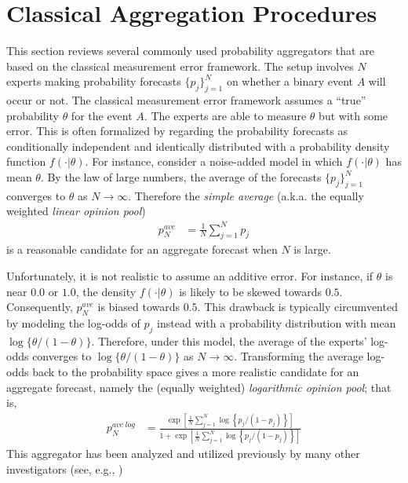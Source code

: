 \documentclass[11pt]{article}
\theoremstyle{definition}
\theoremstyle{definition}
\begin{document}
\section{Classical Aggregation Procedures}
\label{classics}
%
%
This section reviews several commonly used probability aggregators that are based on the classical measurement error framework. The setup involves $N$ experts making probability forecasts $\{p_j\}_{j=1}^N$ on whether a binary event $A$ will occur or not. The classical measurement error framework assumes a ``true'' probability $\theta$ for the event $A$. The experts are able to measure $\theta$ but with some error. This is often formalized by regarding the probability forecasts as conditionally independent and identically distributed  with a probability density function $f(\cdot | \theta)$. 
For instance, consider a noise-added model in which
 $f(\cdot | \theta)$ has mean $\theta$. By the law of large numbers, the average of the forecasts $\{ p_j \}_{j=1}^N$ converges to $\theta$ as $N \to \infty$. Therefore the \textit{simple average} (a.k.a. the equally weighted \textit{linear opinion pool})
\begin{align*}
p_N^{ave} &= \frac{1}{N} \sum_{j=1}^N p_j
\end{align*}
is a reasonable candidate for an aggregate forecast when $N$ is large.

Unfortunately, it is not realistic to assume an additive error. For instance, if $\theta$ is near $0.0$ or $1.0$,  the density $f(\cdot | \theta)$ is likely to be skewed towards $0.5$.  Consequently, $p_{N}^{ave}$ is biased towards $0.5$. This drawback is typically circumvented by modeling the log-odds of $p_j$ instead with a probability distribution with mean $\log\{\theta/(1-\theta)\}$. Therefore, under this model, the average of the experts' log-odds converges to $\log\{\theta/(1-\theta)\}$ as $N \to \infty$. Transforming the average log-odds back to the probability space gives a more realistic candidate for an aggregate forecast, namely the (equally weighted) \textit{logarithmic opinion pool}; that is,
\begin{align*}
p_N^{ave\ log} &= \frac{\exp\left[ \frac{1}{N} \sum_{j=1}^N \log\left\{p_j / (1-p_j)\right\} \right]}{1+\exp\left[ \frac{1}{N} \sum_{j=1}^N \log\left\{p_j / (1-p_j)\right\} \right]}
\end{align*}
This aggregator has been analyzed and utilized previously by many other investigators (see, e.g., \citet{dawid1995coherent, Genest, bacharach1975group})
\end{document}
